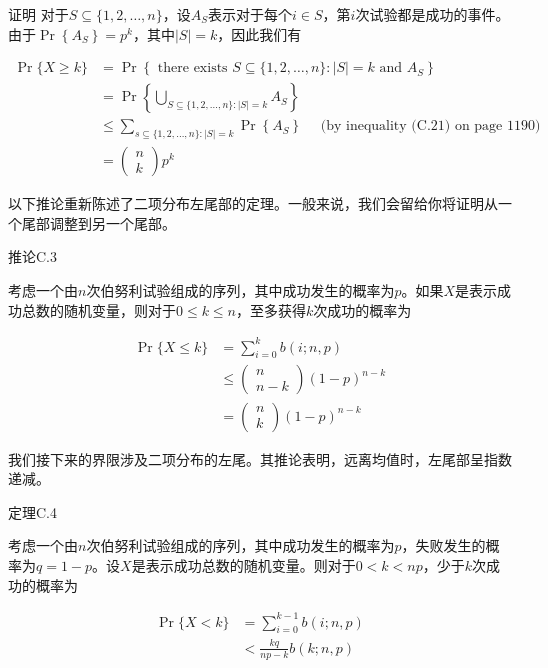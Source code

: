 \documentclass[lang=cn,newtx,10pt,scheme=chinese]{elegantbook}
\begin{document}
证明 对于$S \subseteq\{1,2, \ldots, n\}$，设$A_S$表示对于每个$i \in S$，第$i$次试验都是成功的事件。由于$\operatorname{Pr}\left\{A_S\right\}=p^k$，其中$|S|=k$，因此我们有

$$
\begin{aligned}
\operatorname{Pr}\{X \geq k\} & =\operatorname{Pr}\left\{\text { there exists } S \subseteq\{1,2, \ldots, n\}:|S|=k \text { and } A_S\right\} \\
& =\operatorname{Pr}\left\{\bigcup_{S \subseteq\{1,2, \ldots, n\}:|S|=k} A_S\right\} \\
& \leq \sum_{s \subseteq\{1,2, \ldots, n\}:|S|=k} \operatorname{Pr}\left\{A_S\right\} \quad \text { (by inequality (C.21) on page 1190) } \\
& =\left(\begin{array}{l}
n \\
k
\end{array}\right) p^k
\end{aligned}
$$

以下推论重新陈述了二项分布左尾部的定理。一般来说，我们会留给你将证明从一个尾部调整到另一个尾部。

推论C.3

考虑一个由$n$次伯努利试验组成的序列，其中成功发生的概率为$p$。如果$X$是表示成功总数的随机变量，则对于$0 \leq k \leq n$，至多获得$k$次成功的概率为

$$
\begin{aligned}
\operatorname{Pr}\{X \leq k\} & =\sum_{i=0}^k b(i ; n, p) \\
& \leq\left(\begin{array}{c}
n \\
n-k
\end{array}\right)(1-p)^{n-k} \\
& =\left(\begin{array}{l}
n \\
k
\end{array}\right)(1-p)^{n-k}
\end{aligned}
$$

我们接下来的界限涉及二项分布的左尾。其推论表明，远离均值时，左尾部呈指数递减。

定理C.4

考虑一个由$n$次伯努利试验组成的序列，其中成功发生的概率为$p$，失败发生的概率为$q=1-p$。设$X$是表示成功总数的随机变量。则对于$0<k<n p$，少于$k$次成功的概率为

$$
\begin{aligned}
\operatorname{Pr}\{X<k\} & =\sum_{i=0}^{k-1} b(i ; n, p) \\
& <\frac{k q}{n p-k} b(k ; n, p)
\end{aligned}
$$
\end{document}
